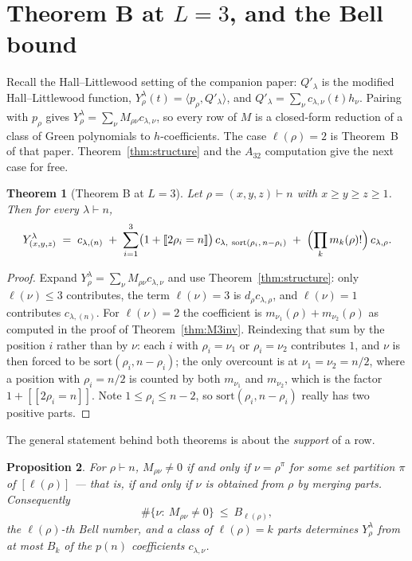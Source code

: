 \documentclass[11pt]{article}
\newtheorem{theorem}{Theorem}
\newtheorem{proposition}[theorem]{Proposition}
\theoremstyle{definition}
\newcommand{\bb}[1]{[\![#1]\!]}
\newcommand{\lam}{\lambda}
\newcommand{\Qp}{Q'}
\begin{document}
\section{Theorem B at $L=3$, and the Bell bound}

Recall the Hall--Littlewood setting of the companion paper: $\Qp_\lam$ is the modified
Hall--Littlewood function, $Y^\lam_\rho(t)=\langle p_\rho,\Qp_\lam\rangle$, and
$\Qp_\lam=\sum_\nu c_{\lam,\nu}(t)h_\nu$. Pairing with $p_\rho$ gives
$Y^\lam_\rho=\sum_\nu M_{\rho\nu}c_{\lam,\nu}$, so every row of $M$ is a closed-form reduction of a
class of Green polynomials to $h$-coefficients. The case $\ell(\rho)=2$ is Theorem~B of that paper.
Theorem~\ref{thm:structure} and the $A_{32}$ computation give the next case for free.

\begin{theorem}[Theorem B at $L=3$]\label{thm:B3}
Let $\rho=(x,y,z)\vdash n$ with $x\ge y\ge z\ge1$. Then for every $\lam\vdash n$,
\[
  Y^{\lam}_{(x,y,z)}
  \;=\;c_{\lam,(n)}
  \;+\;\sum_{i=1}^{3}\bigl(1+\bb{2\rho_i=n}\bigr)\,c_{\lam,\ \mathrm{sort}(\rho_i,\,n-\rho_i)}
  \;+\;\Bigl(\prod_k m_k(\rho)!\Bigr)\,c_{\lam,\rho}.
\]
\end{theorem}

\begin{proof}
Expand $Y^\lam_\rho=\sum_\nu M_{\rho\nu}c_{\lam,\nu}$ and use
Theorem~\ref{thm:structure}: only $\ell(\nu)\le3$ contributes, the term $\ell(\nu)=3$ is
$d_\rho c_{\lam,\rho}$, and $\ell(\nu)=1$ contributes $c_{\lam,(n)}$. For $\ell(\nu)=2$ the
coefficient is $m_{\nu_1}(\rho)+m_{\nu_2}(\rho)$ as computed in the proof of
Theorem~\ref{thm:M3inv}. Reindexing that sum by the position $i$ rather than by $\nu$: each $i$ with
$\rho_i=\nu_1$ or $\rho_i=\nu_2$ contributes $1$, and $\nu$ is then forced to be
$\mathrm{sort}(\rho_i,n-\rho_i)$; the only overcount is at $\nu_1=\nu_2=n/2$, where a position with
$\rho_i=n/2$ is counted by both $m_{\nu_1}$ and $m_{\nu_2}$, which is the factor
$1+\bb{2\rho_i=n}$. Note $1\le\rho_i\le n-2$, so $\mathrm{sort}(\rho_i,n-\rho_i)$ really has two
positive parts.
\end{proof}

The general statement behind both theorems is about the \emph{support} of a row.

\begin{proposition}\label{prop:support}
For $\rho\vdash n$, $M_{\rho\nu}\ne0$ if and only if $\nu=\rho^\pi$ for some set partition $\pi$ of
$[\ell(\rho)]$ --- that is, if and only if $\nu$ is obtained from $\rho$ by merging parts.
Consequently
\[
  \#\{\nu:\ M_{\rho\nu}\ne0\}\ \le\ B_{\ell(\rho)},
\]
the $\ell(\rho)$-th Bell number, and a class of $\ell(\rho)=k$ parts determines $Y^\lam_\rho$ from at
most $B_k$ of the $p(n)$ coefficients $c_{\lam,\nu}$.
\end{proposition}
\end{document}
